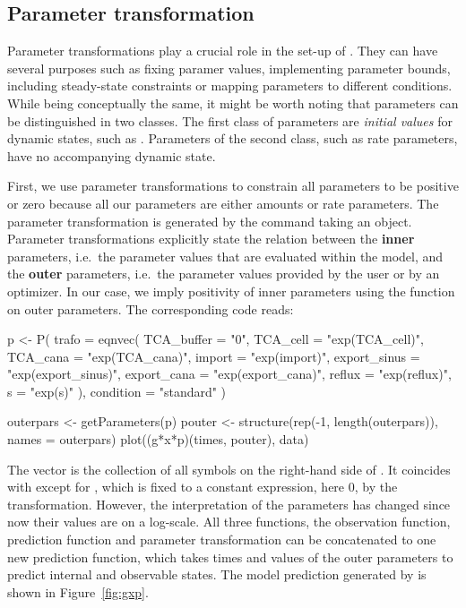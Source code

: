 \documentclass[article]{jss}
\begin{document}
\subsection{Parameter transformation}
Parameter transformations play a crucial role in the set-up of . They can have several purposes such as fixing paramer values, implementing parameter bounds, including steady-state constraints or mapping parameters to different conditions. While being conceptually the same, it might be worth noting that parameters can be distinguished in two classes. The first class of parameters are \textit{initial values} for dynamic states, such as . Parameters of the second class, such as rate parameters, have no accompanying dynamic state.

First, we use parameter transformations to constrain all parameters to be positive or zero because all our parameters are either amounts or rate parameters. The parameter transformation is generated by the  command taking an  object. Parameter transformations explicitly state the relation between the \textbf{inner} parameters, i.e.~the parameter values that are evaluated within the model, and the \textbf{outer} parameters, i.e.~the parameter values provided by the user or by an optimizer. In our case, we imply positivity of inner parameters using the  function on outer parameters.
The corresponding code reads:
\begin{CodeChunk}
\begin{CodeInput}
  p <- P(
    trafo = eqnvec(
      TCA_buffer = "0",
      TCA_cell = "exp(TCA_cell)",
      TCA_cana = "exp(TCA_cana)",
      import = "exp(import)",
      export_sinus = "exp(export_sinus)",
      export_cana = "exp(export_cana)",
      reflux = "exp(reflux)",
      s = "exp(s)"
    ),
    condition = "standard"
  )
  
  outerpars <- getParameters(p)
  pouter <- structure(rep(-1, length(outerpars)), names = outerpars)
  plot((g*x*p)(times, pouter), data)
\end{CodeInput}
\end{CodeChunk}
The vector  is the collection of all symbols on the right-hand side of . It coincides with  except for , which is fixed to a constant expression, here 0, by the transformation. However, the interpretation of the parameters has changed since now their values are on a log-scale. All three functions, the observation function, prediction function and parameter transformation can be concatenated to one new prediction function,  which takes times and values of the outer parameters to predict internal and observable states. The model prediction generated by  is shown in Figure~\ref{fig:gxp}.
\end{document}
